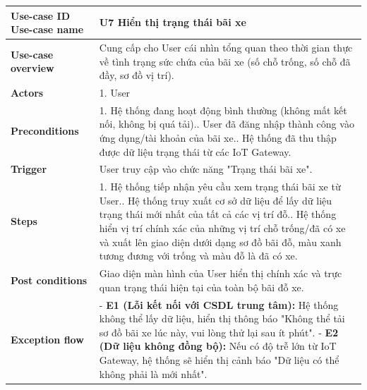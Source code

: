 \vspace{0.5cm}
\noindent
\begin{tabularx}{\textwidth}{|>{\raggedright\arraybackslash}p{4cm}|X|}
\hline
\textbf{Use-case ID} \newline \textbf{Use-case name} & U7 \newline  \textbf{Hiển thị trạng thái bãi xe} \\ \hline
\textbf{Use-case overview} & Cung cấp cho User cái nhìn tổng quan theo thời gian thực về tình trạng sức chứa của bãi xe (số chỗ trống, số chỗ đã đầy, sơ đồ vị trí). \\ \hline
\textbf{Actors} & 1. User \\ \hline
\textbf{Preconditions} & 
1. Hệ thống đang hoạt động bình thường (không mất kết nối, không bị quá tải).\newline
2. User đã đăng nhập thành công vào ứng dụng/tài khoản của bãi xe.\newline
3. Hệ thống đã thu thập được dữ liệu trạng thái từ các IoT Gateway.\\ \hline
\textbf{Trigger} & User truy cập vào chức năng "Trạng thái bãi xe". \\ \hline
\textbf{Steps} & 
1. Hệ thống tiếp nhận yêu cầu xem trạng thái bãi xe từ User.\newline
2. Hệ thống truy xuất cơ sở dữ liệu để lấy dữ liệu trạng thái mới nhất của tất cả các vị trí đỗ.\newline
3. Hệ thống hiển vị trí chính xác của những vị trí chỗ trống/đã có xe và xuất lên giao diện dưới dạng sơ đồ bãi đỗ, màu xanh tương đương với trống và màu đỗ là đã có xe. \\ \hline
\textbf{Post conditions} & Giao diện màn hình của User hiển thị chính xác và trực quan trạng thái hiện tại của toàn bộ bãi đỗ xe. \\ \hline
\textbf{Exception flow} & 
- \textbf{E1 (Lỗi kết nối với CSDL trung tâm):} Hệ thống không thể lấy dữ liệu, hiển thị thông báo "Không thể tải sơ đồ bãi xe lúc này, vui lòng thử lại sau ít phút".\newline
- \textbf{E2 (Dữ liệu không đồng bộ):} Nếu có độ trễ lớn từ IoT Gateway, hệ thống sẽ hiển thị cảnh báo "Dữ liệu có thể không phải là mới nhất". \\ \hline
\end{tabularx}
\newpage




